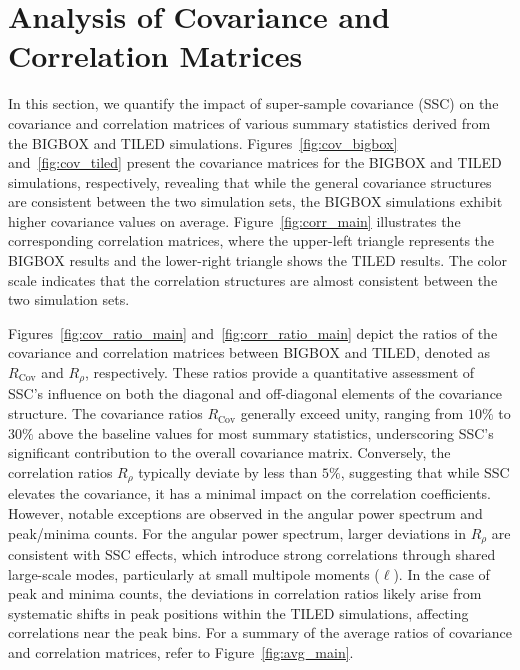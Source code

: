 \clearpage

\section{Analysis of Covariance and Correlation Matrices}
In this section, we quantify the impact of super-sample covariance (SSC) on the covariance and correlation matrices of various summary statistics derived from the BIGBOX and TILED simulations. Figures~\ref{fig:cov_bigbox} and~\ref{fig:cov_tiled} present the covariance matrices for the BIGBOX and TILED simulations, respectively, revealing that while the general covariance structures are consistent between the two simulation sets, the BIGBOX simulations exhibit higher covariance values on average. Figure~\ref{fig:corr_main} illustrates the corresponding correlation matrices, where the upper-left triangle represents the BIGBOX results and the lower-right triangle shows the TILED results. The color scale indicates that the correlation structures are almost consistent between the two simulation sets.

Figures~\ref{fig:cov_ratio_main} and~\ref{fig:corr_ratio_main} depict the ratios of the covariance and correlation matrices between BIGBOX and TILED, denoted as $R_{\text{Cov}}$ and $R_{\rho}$, respectively. These ratios provide a quantitative assessment of SSC's influence on both the diagonal and off-diagonal elements of the covariance structure. The covariance ratios $R_{\text{Cov}}$ generally exceed unity, ranging from $10\%$ to $30\%$ above the baseline values for most summary statistics, underscoring SSC's significant contribution to the overall covariance matrix. Conversely, the correlation ratios $R_{\rho}$ typically deviate by less than $5\%$, suggesting that while SSC elevates the covariance, it has a minimal impact on the correlation coefficients. However, notable exceptions are observed in the angular power spectrum and peak/minima counts. For the angular power spectrum, larger deviations in $R_{\rho}$ are consistent with SSC effects, which introduce strong correlations through shared large-scale modes, particularly at small multipole moments ($\ell$). In the case of peak and minima counts, the deviations in correlation ratios likely arise from systematic shifts in peak positions within the TILED simulations, affecting correlations near the peak bins. For a summary of the average ratios of covariance and correlation matrices, refer to Figure~\ref{fig:avg_main}. 

